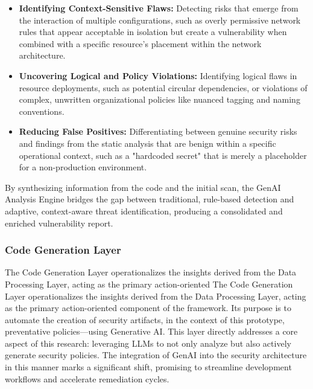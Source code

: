 \begin{itemize}
    \item \textbf{Identifying Context-Sensitive Flaws:} Detecting risks that emerge from the interaction of multiple configurations, such as overly permissive network rules that appear acceptable in isolation but create a vulnerability when combined with a specific resource's placement within the network architecture\cite{noseevich_towards_2015}.
    \item \textbf{Uncovering Logical and Policy Violations:} Identifying logical flaws in resource deployments, such as potential circular dependencies, or violations of complex, unwritten organizational policies like nuanced tagging and naming conventions.
    \item \textbf{Reducing False Positives:} Differentiating between genuine security risks and findings from the static analysis that are benign within a specific operational context, such as a "hardcoded secret" that is merely a placeholder for a non-production environment.
\end{itemize}

By synthesizing information from the code and the initial scan, the GenAI Analysis Engine bridges the gap between traditional, rule-based detection and adaptive, context-aware threat identification, producing a consolidated and enriched vulnerability report.


\subsubsection{Code Generation Layer} %
\label{sec:Code Generation Laye}

The Code Generation Layer operationalizes the insights derived from the Data Processing Layer, acting as the primary action-oriented The Code Generation Layer operationalizes the insights derived from the Data Processing Layer, acting as the primary action-oriented component of the framework. Its purpose is to automate the creation of security artifacts, in the context of this prototype, preventative policies—using Generative AI. This layer directly addresses a core aspect of this research: leveraging LLMs to not only analyze but also actively generate security policies. The integration of GenAI into the security architecture in this manner marks a significant shift, promising to streamline development workflows and accelerate remediation cycles\cite{kumar_generative_nodate}.

